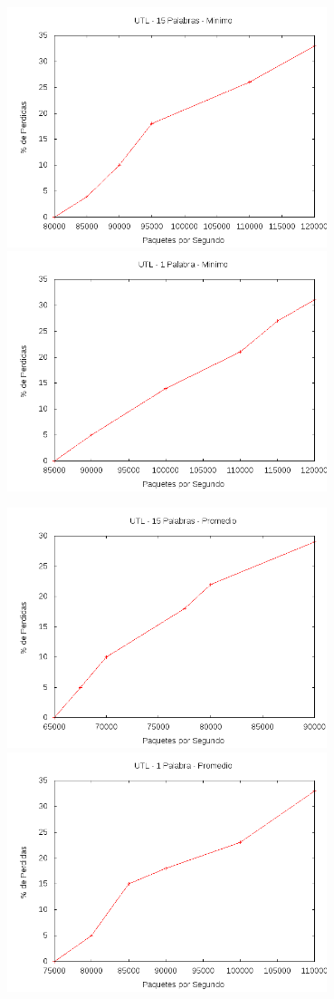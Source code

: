 \documentclass[12pt,spanish]{article}
\begin{document}
\begin{center}
\includegraphics[width=0.7\textwidth]{graf/utl15pmin.png}
\includegraphics[width=0.7\textwidth]{graf/utl1pmin.png}

\includegraphics[width=0.7\textwidth]{graf/utl15prom.png}
\includegraphics[width=0.7\textwidth]{graf/utl1pprom.png}	


\end{center}
\end{document}
